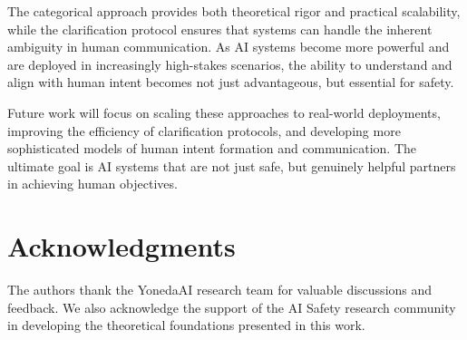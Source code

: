 \documentclass[12pt]{article}
\begin{document}
The categorical approach provides both theoretical rigor and practical scalability, while the clarification protocol ensures that systems can handle the inherent ambiguity in human communication. As AI systems become more powerful and are deployed in increasingly high-stakes scenarios, the ability to understand and align with human intent becomes not just advantageous, but essential for safety.

Future work will focus on scaling these approaches to real-world deployments, improving the efficiency of clarification protocols, and developing more sophisticated models of human intent formation and communication. The ultimate goal is AI systems that are not just safe, but genuinely helpful partners in achieving human objectives.

\section*{Acknowledgments}

The authors thank the YonedaAI research team for valuable discussions and feedback. We also acknowledge the support of the AI Safety research community in developing the theoretical foundations presented in this work.



\end{document}
